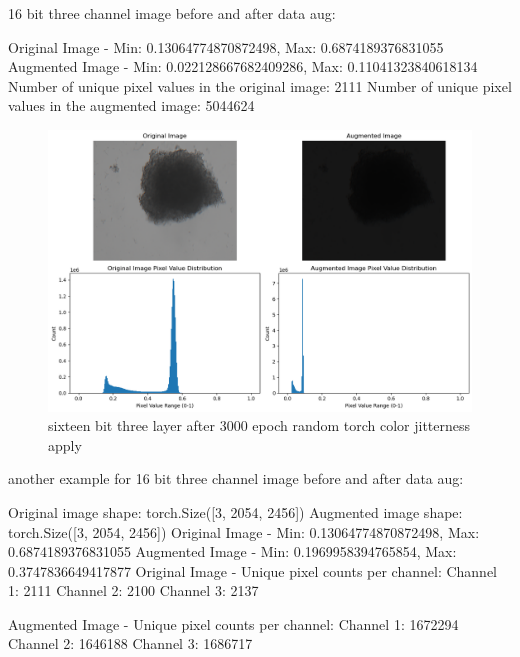 \documentclass[12pt,twoside,a4paper,parskip]{scrbook} %
\begin{document}
16 bit three channel image before and after data aug:

Original Image - Min: 0.13064774870872498, Max: 0.6874189376831055
Augmented Image - Min: 0.022128667682409286, Max: 0.11041323840618134
Number of unique pixel values in the original image: 2111
Number of unique pixel values in the augmented image: 5044624

\begin{figure}[H]
  \centering
  \includegraphics[scale=0.6]{figures/16bit_three_1.png} 
  \caption{sixteen bit three layer after 3000 epoch random torch color jitterness apply}
  \label{fig:16bit_three_version1}
\end{figure}

another example for 16 bit three channel image before and after data aug:

Original image shape: torch.Size([3, 2054, 2456])
Augmented image shape: torch.Size([3, 2054, 2456])
Original Image - Min: 0.13064774870872498, Max: 0.6874189376831055
Augmented Image - Min: 0.1969958394765854, Max: 0.3747836649417877
Original Image - Unique pixel counts per channel:
Channel 1: 2111
Channel 2: 2100
Channel 3: 2137

Augmented Image - Unique pixel counts per channel:
Channel 1: 1672294
Channel 2: 1646188
Channel 3: 1686717
\end{document}
